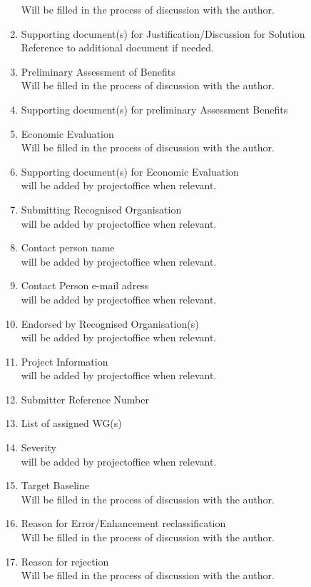 \documentclass{template/openetcs_article}
\begin{document}
\begin{enumerate}
Will be filled in the process of discussion with the author.
\item Supporting document(s) for Justification/Discussion for Solution\\
Reference to additional document if needed.
\item Preliminary Assessment of Benefits\\
Will be filled in the process of discussion with the author.
\item Supporting document(s) for preliminary Assessment Benefits
\item Economic Evaluation\\
Will be filled in the process of discussion with the author.
\item Supporting document(s) for Economic Evaluation\\
will be added by projectoffice when relevant.
\item Submitting Recognised Organisation\\
will be added by projectoffice when relevant.
\item Contact person name\\
will be added by projectoffice when relevant.
\item Contact Person e-mail adress\\
will be added by projectoffice when relevant.
\item Endorsed by Recognised Organisation(s)\\
will be added by projectoffice when relevant.
\item Project Information\\
will be added by projectoffice when relevant.
\item Submitter Reference Number\\
\item List of assigned WG(s)\\
\item Severity\\
will be added by projectoffice when relevant.
\item Target Baseline \\
Will be filled in the process of discussion with the author.
\item Reason for Error/Enhancement reclassification\\
Will be filled in the process of discussion with the author.\\
\item Reason for rejection\\
Will be filled in the process of discussion with the author.

\end{enumerate}
\end{document}
